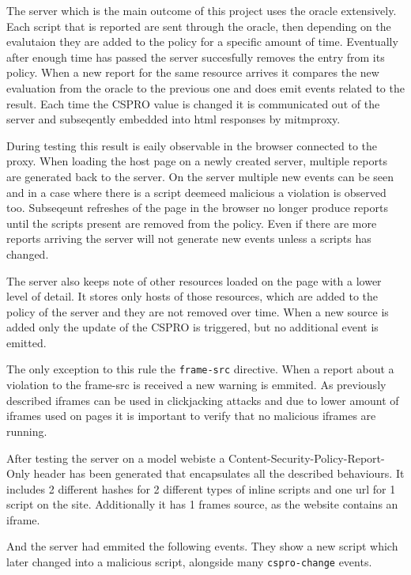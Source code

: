 \begin{description}
The server which is the main outcome of this project uses the oracle extensively.
Each script that is reported are sent through the oracle, then depending on the evalutaion they are added to the policy for a specific amount of time.
Eventually after enough time has passed the server succesfully removes the entry from its policy.
When a new report for the same resource arrives it compares the new evaluation from the oracle to the previous one and does emit events related to the result.
Each time the CSPRO value is changed it is communicated out of the server and subseqently embedded into html responses by mitmproxy.

During testing this result is eaily observable in the browser connected to the proxy.
When loading the host page on a newly created server, multiple reports are generated back to the server.
On the server multiple new events can be seen and in a case where there is a script deemeed malicious a violation is observed too.
Subseqeunt refreshes of the page in the browser no longer produce reports until the scripts present are removed from the policy.
Even if there are more reports arriving the server will not generate new events unless a scripts has changed.

The server also keeps note of other resources loaded on the page with a lower level of detail.
It stores only hosts of those resources, which are added to the policy of the server and they are not removed over time.
When a new source is added only the update of the CSPRO is triggered, but no additional event is emitted.

The only exception to this rule the \texttt{frame-src} directive. 
When a report about a violation to the frame-src is received a new warning is emmited.
As previously described iframes can be used in clickjacking attacks and due to lower amount of iframes used on pages it is important to verify that no malicious iframes are running.

After testing the server on a model webiste a Content-Security-Policy-Report-Only header has been generated that encapsulates all the described behaviours.
It includes 2 different hashes for 2 different types of inline scripts and one url for 1 script on the site.
Additionally it has 1 frames source, as the website contains an iframe.



And the server had emmited the following events.
They show a new script which later changed into a malicious script, alongside many \texttt{cspro-change} events.


\end{description}

